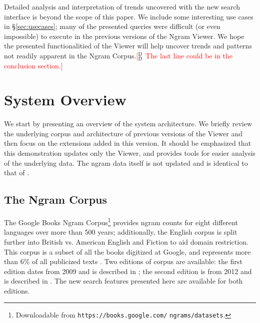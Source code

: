 \documentclass[11pt,a4paper]{article}
\newcommand{\ddcomment}[1]{\textcolor{red}{[$^{\textsc{D}}_{\textsc{D}}$ #1]}}
\begin{document}
Detailed analysis and interpretation of trends uncovered with the new search interface is beyond the scope of this paper. We include some interesting use cases in \S\ref{sec:usecases}; many of the presented queries were difficult (or even impossible) to execute in the previous versions of the Ngram Viewer. We hope the presented functionalitied of the Viewer will help uncover trends and patterns not readily apparent in the Ngram Corpus.\ddcomment{The last line could be in the conclusion section.}

\section{System Overview}
\label{sec:overview}

We start by presenting an overview of the system architecture. We briefly review the underlying corpus and architecture of previous versions of the Viewer \cite{culturomics,lin2012syntactic} and then focus on the extensions added in this version. It should be emphasized that this demonstration updates only the Viewer, and provides tools for easier analysis of the underlying data. The ngram data itself is not updated and is identical to that of .


\subsection{The Ngram Corpus}
	The Google Books Ngram Corpus\footnote{Downloadable from \texttt{https://books.google.com/} \texttt{ngrams/datasets}.} provides ngram counts for eight different languages over more than 500 years; additionally, the English corpus is split further into British vs. American English and Fiction to aid domain restriction. This corpus is a subset of all the books digitized at Google, and represents more than 6\% of all publicized texts \cite{lin2012syntactic}. Two editions of corpus are available: the first edition dates from 2009 and is described in ; the second edition is from 2012 and is described in . The new search features presented here are available for both editions.
\end{document}
